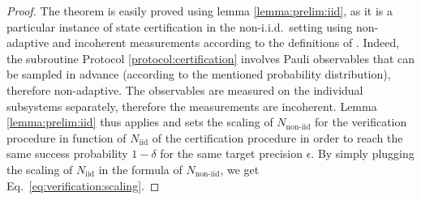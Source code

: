 \documentclass[a4paper,twocolumn,11pt,unpublished]{../../revision/quantumarticle}
\newcommand{\Niid}{N_{\mathrm{iid}}}
\newcommand{\Nnoniid}{N_{\mathrm{non\text{-}iid}}}
\begin{document}
        \begin{proof}
            The theorem is easily proved using lemma \ref{lemma:prelim:iid}, as it is a particular instance of state certification in the non-i.i.d.\ setting using non-adaptive and incoherent measurements according to the definitions of \cite{FKMO24learning}. Indeed, the subroutine Protocol \ref{protocol:certification} involves Pauli observables that can be sampled in advance (according to the mentioned probability distribution), therefore non-adaptive. The observables are measured on the individual subsystems separately, therefore the measurements are incoherent. Lemma \ref{lemma:prelim:iid} thus applies and sets the scaling of $\Nnoniid$ for the verification procedure
            in function of $\Niid$ of the certification procedure in order to reach the same success probability $1-\delta$ for the same target precision $\epsilon$. By simply plugging the scaling of $\Niid$ in the formula of $\Nnoniid$, we get Eq.~\eqref{eq:verification:scaling}.
        \end{proof}
\end{document}
